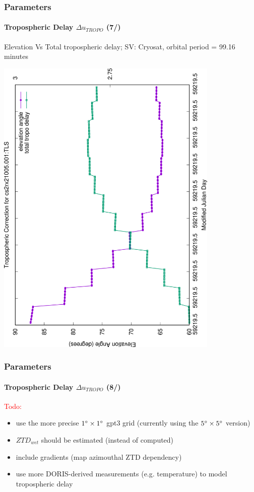 \documentclass{beamer}
\newcommand{\bitem}{\item[\textbullet]}
\begin{document}
\begin{frame}\frametitle{Parameters}\framesubtitle{Tropospheric Delay \(\Delta u_{TROPO}\) (7/)}
  Elevation Vs Total tropospheric delay; SV: Cryosat, orbital period = 99.16 minutes
  \begin{center}
  \includegraphics[angle=-90, width=0.8\textwidth]{cs2rx21005.001-tropo-correction}
  \end{center}
\end{frame}

\begin{frame}\frametitle{Parameters}\framesubtitle{Tropospheric Delay \(\Delta u_{TROPO}\) (8/)}
  \textcolor{red}{Todo:}
  \begin{itemize}
    \bitem use the more precise \(1 \degree \times 1 \degree \) gpt3 grid (currently using the \(5 \degree \times 5 \degree \) version)
    \bitem \(ZTD_{wet}\) should be estimated (instead of computed)
    \bitem include gradients (map azimouthal ZTD dependency)
    \bitem use more DORIS-derived measurements (e.g. temperature) to model tropospheric delay
  \end{itemize}
\end{frame}
\end{document}

